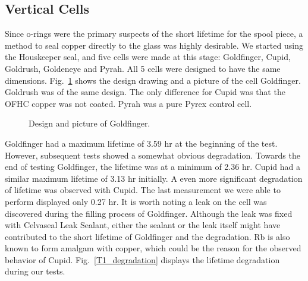 \subsection{Vertical Cells}

Since o-rings were the primary suspects of the short lifetime for the spool piece, a method to seal copper directly to the glass was highly desirable. We started using the Houskeeper seal, and five cells were made at this stage: Goldfinger, Cupid, Goldrush, Goldeneye and Pyrah. All 5 cells were designed to have the same dimensions. Fig.~\ref{goldfinger} shows the design drawing and a picture of the cell Goldfinger. Goldrush was of the same design. The only difference for Cupid was that the OFHC copper was not coated. Pyrah was a pure Pyrex control cell. 

\begin{figure}[t!]
	\centering
	\caption{{Design and picture of Goldfinger. }}
	\label{goldfinger}
\end{figure}

Goldfinger had a maximum lifetime of 3.59 hr at the beginning of the test. However, subsequent tests showed a somewhat obvious degradation. Towards the end of testing Goldfinger, the lifetime was at a minimum of 2.36 hr. Cupid had a similar maximum lifetime of 3.13 hr initially. A even more significant degradation of lifetime was observed with Cupid. The last measurement we were able to perform displayed only 0.27 hr. It is worth noting a leak on the cell was discovered during the filling process of Goldfinger. Although the leak was fixed with Celvaseal Leak Sealant, either the sealant or the leak itself might have contributed to the short lifetime of Goldfinger and the degradation. Rb is also known to form amalgam with copper, which could be the reason for the observed behavior of Cupid. Fig.~\ref{T1_degradation} displays the lifetime degradation during our tests.

